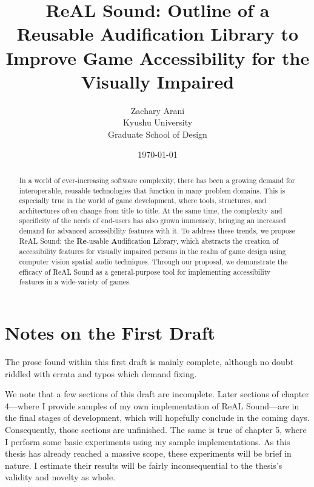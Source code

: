 \documentclass{report}
\newcommand{\rs}{ReAL Sound\xspace}
\newcommand{\rsfull}{\textbf{Re}-usable \textbf{A}udification \textbf{L}ibrary\xspace}
\begin{document}

\author{Zachary Arani \\ Kyushu University \\ Graduate School of Design} %
\title{ReAL Sound: Outline of a Reusable Audification Library to Improve Game Accessibility for the Visually Impaired} 
\date{\today{}} 
\maketitle{} 


\begin{abstract}
    In a world of ever-increasing software complexity, there has been a growing demand for interoperable, reusable technologies that function in many problem domains. This is especially true in the world of game development, where tools, structures, and architectures often change from title to title. At the same time, the complexity and specificity of the needs of end-users has also grown immensely, bringing an increased demand for advanced accessibility features with it. To address these trends, we propose \rs: the \rsfull, which abstracts the creation of accessibility features for visually impaired persons in the realm of game design using computer vision spatial audio techniques. Through our proposal, we demonstrate the efficacy of \rs as a general-purpose tool for implementing accessibility features in a wide-variety of games.  
\end{abstract}

\newpage{} %


\chapter*{Notes on the First Draft}
The prose found within this first draft is mainly complete, although no doubt riddled with errata and typos which demand fixing. 

We note that a few sections of this draft are incomplete. Later sections of chapter 4---where I provide samples of my own implementation of \rs---are in the final stages of development, which will hopefully conclude in the coming days. Consequently, those sections are unfinished. The same is true of chapter 5, where I perform some basic experiments using my sample implementations. As this thesis has already reached a massive scope, these experiments will be brief in nature. I estimate their results will be fairly inconsequential to the thesis's validity and novelty as whole. 
\end{document}
